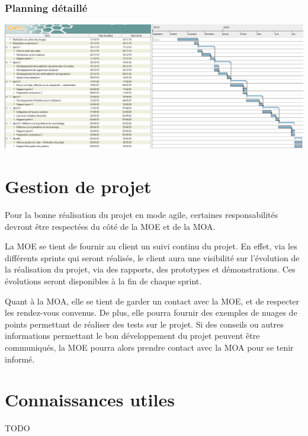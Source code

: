 \documentclass[12pt,titlepage,french]{article}
\begin{document}
\subsubsection*{Planning détaillé}

\begin{center}
    \includegraphics[scale=0.5,angle=90,origin=c]{gantt.png}
    \label{fig:Planning détaillé}
\end{center}


\section{Gestion de projet}

Pour la bonne réalisation du projet en mode agile, certaines responsabilités devront être respectées du côté de la MOE et de la MOA.

La MOE se tient de fournir au client un suivi continu du projet. En effet, via les différents sprints qui seront réalisés, le client aura une visibilité sur l'évolution de la réalisation du projet, via des rapports, des prototypes et démonstrations. Ces évolutions seront disponibles à la fin de chaque sprint.

Quant à la MOA, elle se tient de garder un contact avec la MOE, et de respecter les rendez-vous convenus. De plus, elle pourra fournir des exemples de nuages de points permettant de réaliser des tests sur le projet. Si des conseils ou autres informations permettant le bon développement du projet peuvent être communiqués, la MOE pourra alors prendre contact avec la MOA pour se tenir informé.

\section{Connaissances utiles}

TODO
\end{document}

